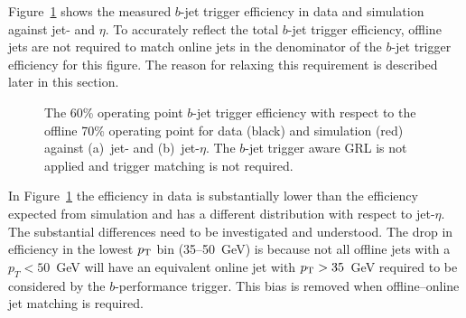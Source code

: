 Figure~\ref{fig:trig-Full_noGRL_eff_noHLTMatch} shows the measured $b$-jet trigger efficiency in data and simulation against jet-\pT{} and $\eta$.
To accurately reflect the total $b$-jet trigger efficiency, %
offline jets are not required to match online jets in the denominator of the $b$-jet trigger efficiency for this figure.
The reason for relaxing this requirement is described later in this section.

\begin{figure}[!htb]
  \begin{center}
    \captionsetup[subfigure]{aboveskip=0pt,justification=centering}
  \end{center}
  \vspace{-1em}
  \caption[The $b$-jet trigger efficiency in data and simulation
    when the $b$-jet trigger aware GRL is not applied and trigger matching is not required.]
  {The 60\% operating point $b$-jet trigger efficiency with respect to the offline 70\% operating point
    for data (black) and simulation (red) against (a)~jet-\pT{} and (b)~jet-$\eta$.
    The $b$-jet trigger aware GRL is not applied and trigger matching is not required.}
  \label{fig:trig-Full_noGRL_eff_noHLTMatch}
\end{figure}


In Figure~\ref{fig:trig-Full_noGRL_eff_noHLTMatch} the efficiency in data is substantially lower
than the efficiency expected from  simulation and has a different distribution with respect to jet-$\eta$.
The substantial differences need to be investigated and understood. 
The drop in efficiency in the lowest $p_{\mathrm{T}}$ bin (35--50~GeV) is because not all offline jets with a $p_T < 50$~GeV  will have an 
equivalent online jet with $p_{\mathrm{T}}{} > 35$~GeV required to be considered by the $b$-performance trigger. This bias is removed when offline--online jet matching is required.


